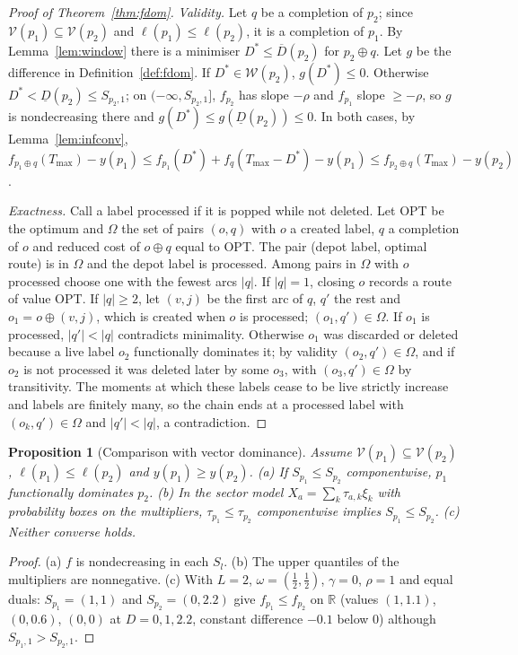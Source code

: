 \documentclass[preprint,11pt]{elsarticle}
\newtheorem{proposition}[theorem]{Proposition}
\theoremstyle{definition}
\theoremstyle{remark}
\newcommand{\R}{\mathbb{R}}
\newcommand{\Dl}{\underline{D}}
\newcommand{\Dh}{\overline{D}}
\begin{document}
\begin{proof}[Proof of Theorem~\ref{thm:fdom}]
\emph{Validity.} Let $q$ be a completion of $p_2$; since $\mathcal V(p_1)\subseteq\mathcal V(p_2)$ and $\ell(p_1)\le\ell(p_2)$, it is a completion of $p_1$. By Lemma~\ref{lem:window} there is a minimiser $D^*\le\Dh(p_2)$ for $p_2\oplus q$. Let $g$ be the difference in Definition~\ref{def:fdom}. If $D^*\in\mathcal W(p_2)$, $g(D^*)\le0$. Otherwise $D^*<\Dl(p_2)\le S_{p_2,1}$; on $(-\infty,S_{p_2,1}]$, $f_{p_2}$ has slope $-\rho$ and $f_{p_1}$ slope $\ge-\rho$, so $g$ is nondecreasing there and $g(D^*)\le g(\Dl(p_2))\le0$. In both cases, by Lemma~\ref{lem:infconv}, $f_{p_1\oplus q}(T_{\max})-y(p_1)\le f_{p_1}(D^*)+f_q(T_{\max}-D^*)-y(p_1)\le f_{p_2\oplus q}(T_{\max})-y(p_2)$.

\emph{Exactness.} Call a label processed if it is popped while not deleted. Let OPT be the optimum and $\Omega$ the set of pairs $(o,q)$ with $o$ a created label, $q$ a completion of $o$ and reduced cost of $o\oplus q$ equal to OPT. The pair (depot label, optimal route) is in $\Omega$ and the depot label is processed. Among pairs in $\Omega$ with $o$ processed choose one with the fewest arcs $|q|$. If $|q|=1$, closing $o$ records a route of value OPT. If $|q|\ge2$, let $(v,j)$ be the first arc of $q$, $q'$ the rest and $o_1=o\oplus(v,j)$, which is created when $o$ is processed; $(o_1,q')\in\Omega$. If $o_1$ is processed, $|q'|<|q|$ contradicts minimality. Otherwise $o_1$ was discarded or deleted because a live label $o_2$ functionally dominates it; by validity $(o_2,q')\in\Omega$, and if $o_2$ is not processed it was deleted later by some $o_3$, with $(o_3,q')\in\Omega$ by transitivity. The moments at which these labels cease to be live strictly increase and labels are finitely many, so the chain ends at a processed label with $(o_k,q')\in\Omega$ and $|q'|<|q|$, a contradiction.
\end{proof}

\begin{proposition}[Comparison with vector dominance]\label{prop:compare}
Assume $\mathcal V(p_1)\subseteq\mathcal V(p_2)$, $\ell(p_1)\le\ell(p_2)$ and $y(p_1)\ge y(p_2)$. (a) If $S_{p_1}\le S_{p_2}$ componentwise, $p_1$ functionally dominates $p_2$. (b) In the sector model $X_a=\sum_k\tau_{a,k}\xi_k$ with probability boxes on the multipliers, $\tau_{p_1}\le\tau_{p_2}$ componentwise implies $S_{p_1}\le S_{p_2}$. (c) Neither converse holds.
\end{proposition}
\begin{proof}
(a) $f$ is nondecreasing in each $S_l$. (b) The upper quantiles of the multipliers are nonnegative. (c) With $L=2$, $\omega=(\tfrac12,\tfrac12)$, $\gamma=0$, $\rho=1$ and equal duals: $S_{p_1}=(1,1)$ and $S_{p_2}=(0,2.2)$ give $f_{p_1}\le f_{p_2}$ on $\R$ (values $(1,1.1)$, $(0,0.6)$, $(0,0)$ at $D=0,1,2.2$, constant difference $-0.1$ below $0$) although $S_{p_1,1}>S_{p_2,1}$.
\end{proof}
\end{document}
